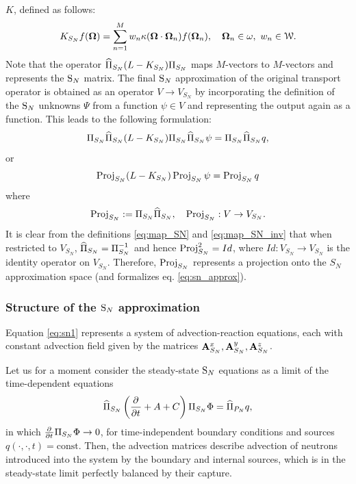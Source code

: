 $K$, defined as follows: 
\begin{equation}\label{eq:KSN}
	\op{K}_{S_N} f(\bomega) = \sum_{n=1}^{M} w_n \kappa(\bomega\cdot\bomega_n) f(\bomega_n), \quad \bomega_n\in \omega,\ 
	w_n\in \mathcal{W}. 
\end{equation}
Note that the operator $\PihSN (\op{L} -
\op{K}_{S_N}) \PiSN$ maps $M$-vectors to $M$-vectors and represents the $\SN$ matrix. The
final $\SN$ approximation of the original transport operator is obtained as an operator $V \to V_{S_N}$ by incorporating the definition of the $\SN$ unknowns $\Psi$ from a function
$\psi \in V$ and representing the output again as a function. This leads to the following formulation:
\begin{equation}\label{eq:sn_op}
	\PiSN \PihSN (\op{L} - \op{K}_{S_N})\PiSN \PihSN \psi = \PiSN \PihSN q,
\end{equation}
or
\begin{equation}\label{eq:sn_op2}
	\Projop[S_N]  (\op{L} - \op{K}_{S_N}) \Projop[S_N] \psi = \Projop[S_N] q
\end{equation}
where
\begin{equation}\label{eq:proj_sn}
	\Projop[S_N] := \PiSN \PihSN, \quad \Projop[S_N] : V \to V_{S_N}.
\end{equation} 
It is clear from the definitions \eqref{eq:map_SN} and \eqref{eq:map_SN_inv} that when restricted to $V_{S_N}$, 
\linebreak[3]\mbox{$\PihSN = \PiSN^{-1}$} and hence $\Projop[S_N]^2 = Id$, where $Id : V_{S_N} \to V_{S_N}$ is the
identity operator on $V_{S_N}$.
 Therefore, $\Projop[S_N]$ represents a projection onto the $S_N$ approximation space (and formalizes eq.
 \eqref{eq:sn_approx}).


\subsubsection{Structure of the $\SN$ approximation}
Equation \eqref{eq:sn1} represents a system of advection-reaction equations, each with constant advection field given by
the matrices $\mat{A}_{S_N}^x, \mat{A}_{S_N}^y, \mat{A}_{S_N}^z$.

Let us for a moment consider the steady-state $\SN$ equations as a limit of the 
time-dependent equations
\begin{equation}\label{eq:PN_ss_app}
	\PihSN \left(\pd{}{t} + A + C\right) \PiSN\Phi = \PihPN q,
\end{equation}
in which $\pd{}{t}\PiSN\Phi \to 0$, for time-independent boundary conditions and sources
\linebreak[3]\mbox{$q(\cdot,\cdot,t) = \text{const}$}.
Then, the advection matrices describe advection of neutrons introduced into the system by the boundary and internal
sources, which is in the steady-state limit perfectly balanced by their capture.

